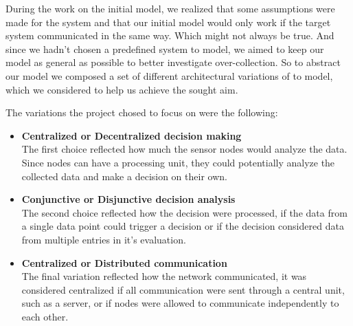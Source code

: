 During the work on the initial model, we realized that some assumptions were made for the system and that our initial model would only work if the target system communicated in the same way. Which might not always be true. And since we hadn't chosen a predefined system to model, we aimed to keep our model as general as possible to better investigate over-collection. So to abstract our model we composed a set of different architectural variations of \wsns to model, which we considered to help us achieve the sought aim.



The variations the project chosed to focus on were the following:

\begin{itemize}
\item[] \textbf{Centralized or Decentralized decision making} \\ The first choice reflected how much the sensor nodes would analyze the data. Since nodes can have a processing unit, they could potentially analyze the collected data and make a decision on their own.
\item[] \textbf{Conjunctive or Disjunctive decision analysis} \\ The second choice reflected how the decision were processed, if the data from a single data point could trigger a decision or if the decision considered data from multiple entries in it's evaluation.
\item[] \textbf{Centralized or Distributed communication} \\ The final variation reflected how the network communicated, it was considered centralized if all communication were sent through a central unit, such as a server, or if nodes were allowed to communicate independently to each other. 
\end{itemize}




